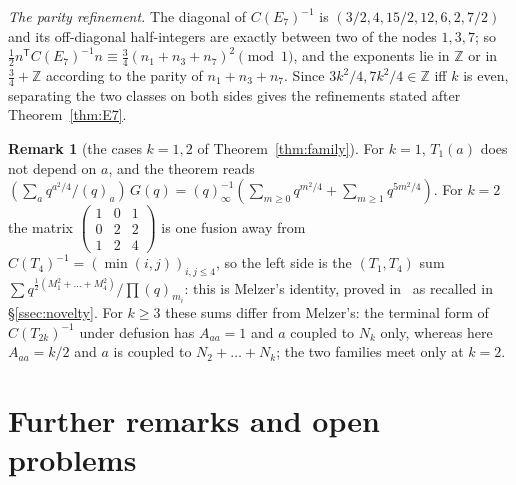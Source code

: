 \documentclass[11pt]{amsart}
\theoremstyle{definition}
\newtheorem{remark}[theorem]{Remark}
\numberwithin{equation}{section}
\newcommand{\Z}{\mathbb{Z}}
\newcommand{\T}{\mathsf T}
\begin{document}
\emph{The parity refinement.} The diagonal of $C(E_7)^{-1}$ is $(3/2,4,15/2,12,6,2,7/2)$ and its
off-diagonal half-integers are exactly between two of the nodes $1,3,7$; so
$\frac12n^{\T}C(E_7)^{-1}n\equiv\frac34(n_1+n_3+n_7)^2\pmod1$, and the exponents lie in $\Z$ or in
$\frac34+\Z$ according to the parity of $n_1+n_3+n_7$. Since $3k^2/4,7k^2/4\in\Z$ iff $k$ is even, separating
the two classes on both sides gives the refinements stated after Theorem~\ref{thm:E7}.

\begin{remark}[the cases $k=1,2$ of Theorem~\ref{thm:family}]
For $k=1$, $T_1(a)$ does not depend on $a$, and the theorem reads
$(\sum_aq^{a^2/4}/(q)_a)\,G(q)=(q)_\infty^{-1}(\sum_{m\ge0}q^{m^2/4}+\sum_{m\ge1}q^{5m^2/4})$. For $k=2$
the matrix $\left(\begin{smallmatrix}1&0&1\\0&2&2\\1&2&4\end{smallmatrix}\right)$ is one fusion away from
$C(T_4)^{-1}=(\min(i,j))_{i,j\le4}$, so the left side is the $(T_1,T_4)$ sum
$\sum q^{\frac12(M_1^2+\dots+M_4^2)}/\prod(q)_{m_i}$: this is Melzer's identity, proved
in~\cite{BIS,Warnaar03} as recalled in §\ref{ssec:novelty}. For $k\ge3$ these sums differ from Melzer's: the
terminal form of $C(T_{2k})^{-1}$ under defusion has $A_{aa}=1$ and $a$ coupled to $N_k$ only, whereas here
$A_{aa}=k/2$ and $a$ is coupled to $N_2+\dots+N_k$; the two families meet only at $k=2$.
\end{remark}

\section{Further remarks and open problems}\label{sec:open}
\end{document}
